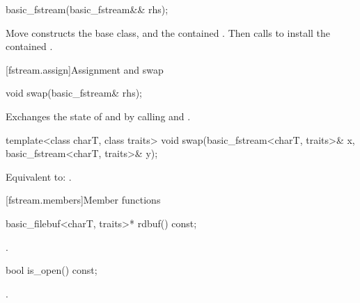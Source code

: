 %
\begin{itemdecl}
basic_fstream(basic_fstream&& rhs);
\end{itemdecl}

\begin{itemdescr}
\pnum
\effects
Move constructs the base class, and the contained .
Then calls 
to install the contained .
\end{itemdescr}

[fstream.assign]{Assignment and swap}

%
\begin{itemdecl}
void swap(basic_fstream& rhs);
\end{itemdecl}

\begin{itemdescr}
\pnum
\effects
Exchanges the state of 
and  by calling
 and
.
\end{itemdescr}

%
\begin{itemdecl}
template<class charT, class traits>
  void swap(basic_fstream<charT, traits>& x,
            basic_fstream<charT, traits>& y);
\end{itemdecl}

\begin{itemdescr}
\pnum
\effects
Equivalent to: .
\end{itemdescr}

[fstream.members]{Member functions}

%
\begin{itemdecl}
basic_filebuf<charT, traits>* rdbuf() const;
\end{itemdecl}

\begin{itemdescr}
\pnum
\returns
{}.
\end{itemdescr}

%
\begin{itemdecl}
bool is_open() const;
\end{itemdecl}

\begin{itemdescr}
\pnum
\returns
{}.
\end{itemdescr}

